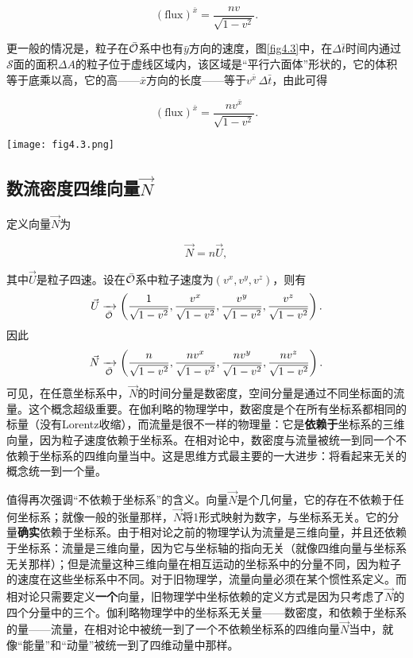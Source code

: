\[
    (\text{flux})^{\bar{x}} = \frac{nv}{\sqrt{1 - v^2}}.
\]

更一般的情况是，粒子在$\bar{\mathcal{O}}$系中也有$\bar{y}$方向的速度，图\ref{fig4.3}中，在$\Delta \bar{t}$时间内通过$\mathscr{S}$面的面积$\Delta A$的粒子位于虚线区域内，该区域是“平行六面体”形状的，它的体积等于底乘以高，它的高——$\bar{x}$方向的长度——等于$v^{\bar{x}} \,\Delta \bar{t}$，由此可得

\begin{equation}
    (\text{flux})^{\bar{x}} = \frac{n v^{\bar{x}}}{\sqrt{1 - v^2}}.
\label{equ4.3}
\end{equation}

{
    \centering
    \texttt{[image: fig4.3.png]}
    \label{fig4.3}
}


\subsection*{数流密度四维向量$\vec{N}$}
定义向量$\vec{N}$为
\begin{shaded}
\begin{equation}
    \vec{N} = n \vec{U},
\label{equ4.4}
\end{equation}
\end{shaded}
其中$\vec{U}$是粒子四速。设在$\bar{\mathcal{O}}$系中粒子速度为$(v^x, v^y, v^z)$，则有
\[
    \vec{U} \xrightarrow[\bar{\mathcal{O}}]{ } \left( \frac{1}{\sqrt{1 - v^2}}, \frac{v^x}{\sqrt{1 - v^2}}, \frac{v^y}{\sqrt{1 - v^2}}, \frac{v^z}{\sqrt{1 - v^2}} \right).
\]
因此
\begin{equation}
    \vec{N} \xrightarrow[\bar{\mathcal{O}}]{ } \left( \frac{n}{\sqrt{1 - v^2}}, \frac{nv^x}{\sqrt{1 - v^2}}, \frac{n v^y}{\sqrt{1 - v^2}}, \frac{n v^z}{\sqrt{1 - v^2}} \right).
\label{equ4.5}
\end{equation}
可见，在任意坐标系中，$\vec{N}$的时间分量是数密度，空间分量是通过不同坐标面的流量。这个概念超级重要。在伽利略的物理学中，数密度是个在所有坐标系都相同的标量（没有Lorentz收缩），而流量是很不一样的物理量：它是\textbf{依赖于}坐标系的三维向量，因为粒子速度依赖于坐标系。在相对论中，数密度与流量被统一到同一个不依赖于坐标系的四维向量当中。这是思维方式最主要的一大进步：将看起来无关的概念统一到一个量。

值得再次强调“不依赖于坐标系”的含义。向量$\vec{N}$是个几何量，它的存在不依赖于任何坐标系；就像一般的张量那样，$\vec{N}$将1形式映射为数字，与坐标系无关。它的分量\textbf{确实}依赖于坐标系。由于相对论之前的物理学认为流量是三维向量，并且还依赖于坐标系：流量是三维向量，因为它与坐标轴的指向无关（就像四维向量与坐标系无关那样）；但是流量这种三维向量在相互运动的坐标系中的分量不同，因为粒子的速度在这些坐标系中不同。对于旧物理学，流量向量必须在某个惯性系定义。而相对论只需要定义\textbf{一个}向量，旧物理学中坐标依赖的定义方式是因为只考虑了$\vec{N}$的四个分量中的三个。伽利略物理学中的坐标系无关量——数密度，和依赖于坐标系的量——流量，在相对论中被统一到了一个不依赖坐标系的四维向量$\vec{N}$当中，就像“能量”和“动量”被统一到了四维动量中那样。

